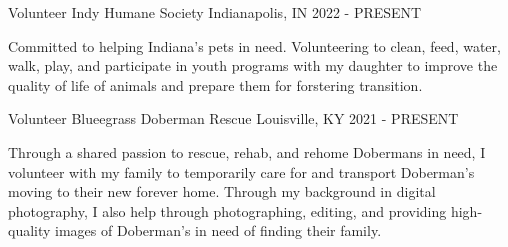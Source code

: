 \vspace{-0.5em}


\begin{cventries}



\cventry
{Volunteer} %
{Indy Humane Society} %
{Indianapolis, IN} %
{2022 - PRESENT} %
{ %
	\begin{cvitems}
		\item {Committed to helping Indiana's pets in need.  Volunteering to clean, feed, water, walk, play, and participate in youth programs with my daughter to improve the quality of life of animals and prepare them for forstering transition.}
	\end{cvitems}
}


\cventry
{Volunteer}
{Blueegrass Doberman Rescue} %
{Louisville, KY}
{2021 - PRESENT} %
{ %
	\begin{cvitems}
		\item {Through a shared passion to rescue, rehab, and rehome Dobermans in need, I volunteer with my family to temporarily care for and transport Doberman's moving to their new forever home.  Through my background in digital photography, I also help through photographing, editing, and providing high-quality images of Doberman's in need of finding their family.}
	\end{cvitems}
}

\newpage


\end{cventries}